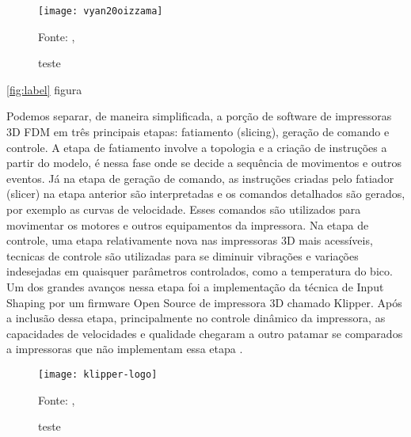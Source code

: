 \begin{figure}[!htb]
    \centering
    \caption{teste}
    \texttt{[image: vyan20oizzama]}

    {\footnotesize Fonte: \citeauthor{vyavahare20}, \citeyear{vyavahare20}}
    \label{fig:label3}
\end{figure}

\ref{fig:label} figura

Podemos separar, de maneira simplificada, a porção de software de impressoras 3D
FDM em três principais etapas: fatiamento (slicing), geração de comando e controle.
A etapa de fatiamento involve a topologia e a criação de instruções a partir do modelo,
é nessa fase onde se decide a sequência de movimentos e outros eventos.
Já na etapa de geração de comando, as instruções criadas pelo fatiador (slicer) na etapa anterior
são interpretadas e os comandos detalhados são gerados, por exemplo as curvas de velocidade.
Esses comandos são utilizados para movimentar os motores e outros equipamentos da impressora.
Na etapa de controle, uma etapa relativamente nova nas impressoras 3D mais acessíveis, 
tecnicas de controle são utilizadas para se diminuir vibrações e variações indesejadas em quaisquer
parâmetros controlados, como a temperatura do bico. Um dos grandes avanços nessa etapa
foi a implementação da técnica de Input Shaping por um firmware Open Source de impressora 3D chamado Klipper.
Após a inclusão dessa etapa, principalmente no controle dinâmico da impressora, as capacidades
de velocidades e qualidade chegaram a outro patamar se comparados a impressoras que não implementam essa etapa \cite{klipperdoc}.

\begin{figure}[!htb]
    \centering
    \caption{teste}
    \texttt{[image: klipper-logo]}

    {\footnotesize Fonte: \citeauthor{klipperdoc}, \citeyear{klipperdoc}}
    \label{fig:label9}
\end{figure}

